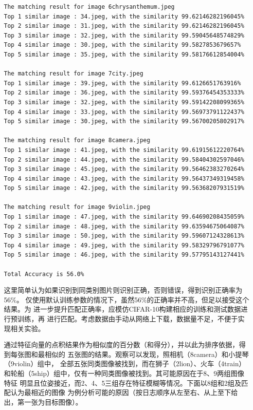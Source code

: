 \documentclass{article}
\begin{document}
\begin{lstlisting}
The matching result for image 6chrysanthemum.jpeg
Top 1 similar image : 34.jpeg, with the similarity 99.62146282196045%
Top 2 similar image : 31.jpeg, with the similarity 99.62146282196045%
Top 3 similar image : 32.jpeg, with the similarity 99.59045648574829%
Top 4 similar image : 30.jpeg, with the similarity 99.5827853679657%
Top 5 similar image : 35.jpeg, with the similarity 99.58176612854004%

The matching result for image 7city.jpeg
Top 1 similar image : 39.jpeg, with the similarity 99.6126651763916%
Top 2 similar image : 36.jpeg, with the similarity 99.59376454353333%
Top 3 similar image : 32.jpeg, with the similarity 99.59142208099365%
Top 4 similar image : 33.jpeg, with the similarity 99.56973791122437%
Top 5 similar image : 30.jpeg, with the similarity 99.56700205802917%

The matching result for image 8camera.jpeg
Top 1 similar image : 41.jpeg, with the similarity 99.61915612220764%
Top 2 similar image : 44.jpeg, with the similarity 99.58404302597046%
Top 3 similar image : 45.jpeg, with the similarity 99.56462383270264%
Top 4 similar image : 43.jpeg, with the similarity 99.56437349319458%
Top 5 similar image : 42.jpeg, with the similarity 99.56368207931519%

The matching result for image 9violin.jpeg
Top 1 similar image : 47.jpeg, with the similarity 99.64690208435059%
Top 2 similar image : 48.jpeg, with the similarity 99.63594675064087%
Top 3 similar image : 50.jpeg, with the similarity 99.59607124328613%
Top 4 similar image : 49.jpeg, with the similarity 99.58329796791077%
Top 5 similar image : 46.jpeg, with the similarity 99.57795143127441%

Total Accuracy is 56.0%
\end{lstlisting}

    这里简单认为如果识别到同类别图片则识别正确，否则错误，得到识别正确率为56\%。
    仅使用默认训练参数的情况下，虽然56\%的正确率并不高，但足以接受这个结果。为
    进一步提升匹配正确率，应模仿CIFAR-10构建相应的训练和测试数据进行预训练，再
    进行匹配。考虑数据由手动从网络上下载，数据量不足，不便于实现相关实验。

    通过特征向量的点积结果作为相似度的百分数（和得分），并以此为排序依据，得到每张图和最相似的
    五张图的结果。观察可以发现，照相机（8camera）和小提琴（9violin）组中，
    全部五张同类图像被找到，而在狮子（2lion）、火车（4train）
    和轮船（5ship）组中，仅有一种同类图像被找到。其可能原因在于8、9两组图像特征
    明显且位姿接近，而2、4、5三组存在特征模糊等情况。下面以8组和2组及匹配认为最相近的图像
    为例分析可能的原因（按日志顺序从左至右、从上至下给出，第一张为目标图像）。
\end{document}
